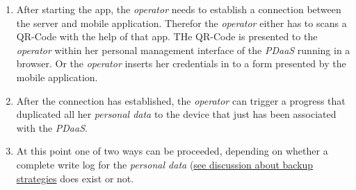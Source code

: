 \documentclass[12pt,english,a4paper,titlepage,cleardoublepage=empty,dottedtoc]{report}
\begin{document}
\begin{enumerate}
\def\labelenumi{\arabic{enumi}.}
\item
  After starting the app, the \emph{operator} needs to establish a
  connection between the server and mobile application. Therefor the
  \emph{operator} either has to scans a QR-Code with the help of that
  app. THe QR-Code is presented to the \emph{operator} within her
  personal management interface of the \emph{PDaaS} running in a
  browser. Or the \emph{operator} inserts her credentials in to a form
  presented by the mobile application.
\item
  After the connection has established, the \emph{operator} can trigger
  a progress that duplicated all her \emph{personal data} to the device
  that just has been associated with the \emph{PDaaS}.
\item
  At this point one of two ways can be proceeded, depending on whether a
  complete write log for the \emph{personal data}
  (\protect\hyperlink{data}{see discussion about backup strategies} does
  exist or not.


\end{enumerate}
\end{document}
